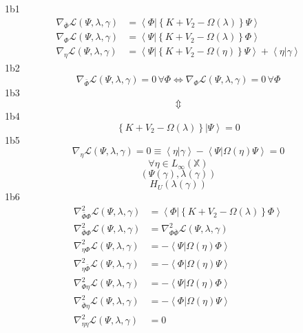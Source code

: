 \documentclass[aps,preprint]{revtex4}%
\begin{document}
\bigskip

1b1%
\begin{align*}
\nabla_{\bar{\Phi}}\mathcal{L}\left(  \Psi,\lambda,\gamma\right)   &
=\left\langle \left.  \Phi\right\vert \left\{  K+V_{2}-\Omega\left(
\lambda\right)  \right\}  \Psi\right\rangle \\
\nabla_{\Phi}\mathcal{L}\left(  \Psi,\lambda,\gamma\right)   &  =\left\langle
\left.  \Psi\right\vert \left\{  K+V_{2}-\Omega\left(  \lambda\right)
\right\}  \Phi\right\rangle \\
\nabla_{\eta}\mathcal{L}\left(  \Psi,\lambda,\gamma\right)   &  =\left\langle
\left.  \Psi\right\vert \left\{  K+V_{2}-\Omega\left(  \eta\right)  \right\}
\Psi\right\rangle +\left\langle \eta\left\vert \gamma\right.  \right\rangle
\end{align*}
1b2%
\[
\nabla_{\bar{\Phi}}\mathcal{L}\left(  \Psi,\lambda,\gamma\right)
=0\,\forall\Phi\Leftrightarrow\nabla_{\Phi}\mathcal{L}\left(  \Psi
,\lambda,\gamma\right)  =0\,\forall\Phi
\]
1b3%
\[
\left.  \Updownarrow\right.
\]
1b4%
\[
\left\{  K+V_{2}-\Omega\left(  \lambda\right)  \right\}  \left\vert
\Psi\right\rangle \left.  =\right.  0
\]
1b5%
\[
\nabla_{\eta}\mathcal{L}\left(  \Psi,\lambda,\gamma\right)  =0\equiv
\left\langle \eta\left\vert \gamma\right.  \right\rangle -\left\langle \left.
\Psi\right\vert \Omega\left(  \eta\right)  \Psi\right\rangle =0
\]%
\[
\forall\eta\in L_{\infty}\left(  \mathbb{X}\right)
\]%
\[
\left(  \Psi\left(  \gamma\right)  ,\lambda\left(  \gamma\right)  \right)
\]%
\[
H_{U}\left(  \lambda\left(  \gamma\right)  \right)
\]
1b6%
\begin{align*}
\nabla_{\bar{\Phi}\Phi}^{2}\mathcal{L}\left(  \Psi,\lambda,\gamma\right)   &
=\left\langle \left.  \Phi\right\vert \left\{  K+V_{2}-\Omega\left(
\lambda\right)  \right\}  \Phi\right\rangle \\
\nabla_{\bar{\Phi}\Phi}^{2}\mathcal{L}\left(  \Psi,\lambda,\gamma\right)   &
=\nabla_{\Phi\bar{\Phi}}^{2}\mathcal{L}\left(  \Psi,\lambda,\gamma\right) \\
\nabla_{\eta\Phi}^{2}\mathcal{L}\left(  \Psi,\lambda,\gamma\right)   &
=-\left\langle \left.  \Psi\right\vert \Omega\left(  \eta\right)
\Phi\right\rangle \\
\nabla_{\eta\bar{\Phi}}^{2}\mathcal{L}\left(  \Psi,\lambda,\gamma\right)   &
=-\left\langle \left.  \Phi\right\vert \Omega\left(  \eta\right)
\Psi\right\rangle \\
\nabla_{\Phi\eta}^{2}\mathcal{L}\left(  \Psi,\lambda,\gamma\right)   &
=-\left\langle \left.  \Psi\right\vert \Omega\left(  \eta\right)
\Phi\right\rangle \\
\nabla_{\bar{\Phi}\eta}^{2}\mathcal{L}\left(  \Psi,\lambda,\gamma\right)   &
=-\left\langle \left.  \Phi\right\vert \Omega\left(  \eta\right)
\Psi\right\rangle \\
\nabla_{\eta\eta}^{2}\mathcal{L}\left(  \Psi,\lambda,\gamma\right)   &  =0
\end{align*}
\end{document}
